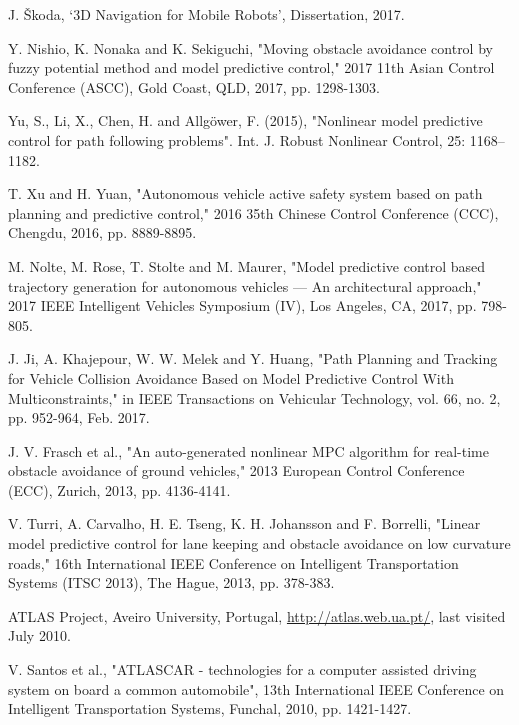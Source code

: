 \documentclass[conference, 11pt]{IEEEtran}
\begin{document}
\begin{thebibliography}{00}
	
	J. Škoda, ‘3D Navigation for Mobile Robots’, Dissertation, 2017.
	
	Y. Nishio, K. Nonaka and K. Sekiguchi, "Moving obstacle avoidance control by fuzzy potential method and model predictive control," 2017 11th Asian Control Conference (ASCC), Gold Coast, QLD, 2017, pp. 1298-1303.
	
	Yu, S., Li, X., Chen, H. and Allgöwer, F. (2015), "Nonlinear model predictive control for path following problems". Int. J. Robust Nonlinear Control, 25: 1168–1182. 
	
	T. Xu and H. Yuan, "Autonomous vehicle active safety system based on path planning and predictive control," 2016 35th Chinese Control Conference (CCC), Chengdu, 2016, pp. 8889-8895.
	
	M. Nolte, M. Rose, T. Stolte and M. Maurer, "Model predictive control based trajectory generation for autonomous vehicles — An architectural approach," 2017 IEEE Intelligent Vehicles Symposium (IV), Los Angeles, CA, 2017, pp. 798-805.
	
	J. Ji, A. Khajepour, W. W. Melek and Y. Huang, "Path Planning and Tracking for Vehicle Collision Avoidance Based on Model Predictive Control With Multiconstraints," in IEEE Transactions on Vehicular Technology, vol. 66, no. 2, pp. 952-964, Feb. 2017.
	
	J. V. Frasch et al., "An auto-generated nonlinear MPC algorithm for real-time obstacle avoidance of ground vehicles," 2013 European Control Conference (ECC), Zurich, 2013, pp. 4136-4141.
	
	V. Turri, A. Carvalho, H. E. Tseng, K. H. Johansson and F. Borrelli, "Linear model predictive control for lane keeping and obstacle avoidance on low curvature roads," 16th International IEEE Conference on Intelligent Transportation Systems (ITSC 2013), The Hague, 2013, pp. 378-383.	
	
	ATLAS  Project,  Aveiro  University, Portugal, \url{http://atlas.web.ua.pt/}, last visited July 2010.
		
	V. Santos et al., "ATLASCAR - technologies for a computer assisted driving system on board a common automobile", 13th International IEEE Conference on Intelligent Transportation Systems, Funchal, 2010, pp. 1421-1427.
		

\end{thebibliography}
\end{document}
